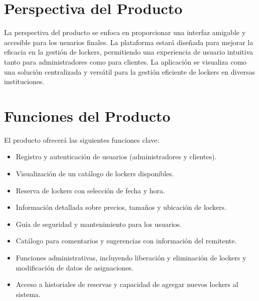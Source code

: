 \documentclass[12pt,a4paper]{article}
\begin{document}
\section{Perspectiva del Producto}
La perspectiva del producto se enfoca en proporcionar una interfaz amigable y accesible para los usuarios finales. La plataforma estará diseñada para mejorar la eficacia en la gestión de lockers, permitiendo una experiencia de usuario intuitiva tanto para administradores como para clientes. La aplicación se visualiza como una solución centralizada y versátil para la gestión eficiente de lockers en diversas instituciones.

\section{Funciones del Producto}
El producto ofrecerá las siguientes funciones clave:

\begin{itemize}
    \item Registro y autenticación de usuarios (administradores y clientes).
    \item Visualización de un catálogo de lockers disponibles.
    \item Reserva de lockers con selección de fecha y hora.
    \item Información detallada sobre precios, tamaños y ubicación de lockers.
    \item Guía de seguridad y mantenimiento para los usuarios.
    \item Catálogo para comentarios y sugerencias con información del remitente.
    \item Funciones administrativas, incluyendo liberación y eliminación de lockers y  modificación de datos de asignaciones.
    \item Acceso a historiales de reservas y capacidad de agregar nuevos lockers al sistema.
\end{itemize}
\end{document}

